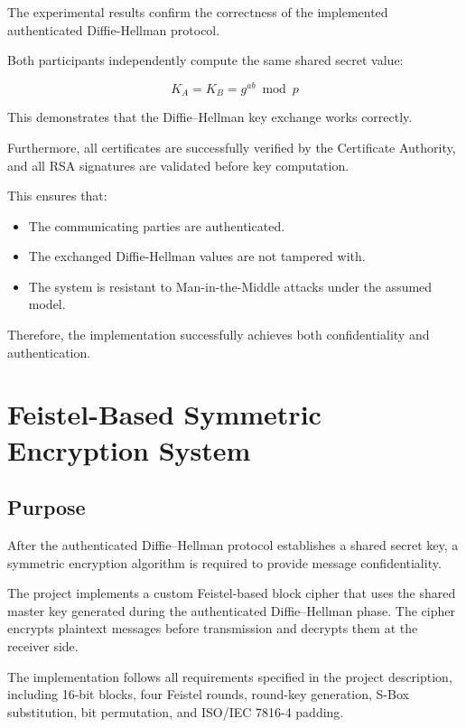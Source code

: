 \documentclass[12pt]{article}
\begin{document}
The experimental results confirm the correctness of the implemented authenticated
Diffie-Hellman protocol.

Both participants independently compute the same shared secret value:

\begin{equation}
K_A = K_B = g^{ab} \bmod p
\end{equation}

This demonstrates that the Diffie--Hellman key exchange works correctly.

Furthermore, all certificates are successfully verified by the Certificate Authority,
and all RSA signatures are validated before key computation.

This ensures that:

\begin{itemize}
\item The communicating parties are authenticated.
\item The exchanged Diffie-Hellman values are not tampered with.
\item The system is resistant to Man-in-the-Middle attacks under the assumed model.
\end{itemize}

Therefore, the implementation successfully achieves both confidentiality and authentication.





\section{Feistel-Based Symmetric Encryption System}

\subsection{Purpose}

After the authenticated Diffie--Hellman protocol establishes a shared secret key, a symmetric encryption algorithm is required to provide message confidentiality.

The project implements a custom Feistel-based block cipher that uses the shared master key generated during the authenticated Diffie--Hellman phase. The cipher encrypts plaintext messages before transmission and decrypts them at the receiver side.

The implementation follows all requirements specified in the project description, including 16-bit blocks, four Feistel rounds, round-key generation, S-Box substitution, bit permutation, and ISO/IEC 7816-4 padding.
\end{document}
